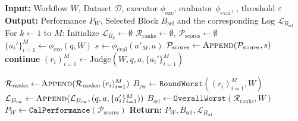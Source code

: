 \documentclass{article}
\theoremstyle{plain}
\theoremstyle{definition}
\theoremstyle{remark}
\begin{document}
\begin{algorithm}[t]
\caption{Evaluation-Judge}\label{alg:eval_judge}
\begin{algorithmic}[1]
    \STATE \textbf{Input:} Workflow $W$, Dataset $\mathcal{D}$, executor $\phi_{\text{exe}}$, evaluator $\phi_{\text{eval}}$, , threshold $\varepsilon$
    \STATE \textbf{Output:} Performance $P_W$, Selected Block $B_{\text{sel}}$ and the corresponding Log $\mathcal{L}_{B_{\text{sel}}}$
    \STATE For $k \leftarrow 1 \text{ to } M$: Initialize $\mathcal{L}_{B_k} \leftarrow \emptyset$ 
    \STATE $\mathcal{R}_{\text{ranks}} \leftarrow \emptyset$, $\mathcal{P}_{\text{scores}} \leftarrow \emptyset$
        \STATE $\{a_i'\}_{i=1}^M \leftarrow \phi_{\text{exe}}(q, W)$
        \STATE  $s\leftarrow \phi_{\text{eval}}(a'_M, a)$ 
        \STATE $\mathcal{P}_{\text{scores}} \gets \textsc{Append}(\mathcal{P}_{\text{scores}}, s)$
            \STATE \textbf{continue} %
        \ELSE
            \STATE $(r_i)_{i=1}^M \leftarrow \text{Judge}(W, q, a, \{a_i'\}_{i=1}^M)$ %
            
            \STATE $\mathcal{R}_{\text{ranks}} \gets \textsc{Append}(\mathcal{R}_{\text{ranks}}, (r_i)_{i=1}^M)$ %
            \STATE $B_{\text{rw}} \leftarrow \texttt{RoundWorst}((r_i)_{i=1}^M, W)$ %
            \STATE $\mathcal{L}_{B_{\text{rw}}} \gets \textsc{Append}(\mathcal{L}_{B_{\text{rw}}}, (q, a, \{a_i'\}_{i=1}^M))$ %
        \ENDIF
    \ENDFOR
    \STATE $B_{\text{sel}} \leftarrow \texttt{OverallWorst}(\mathcal{R}_{\text{ranks}}, W)$ %
    \STATE $P_W \leftarrow \texttt{CalPerformance}(\mathcal{P}_{\text{scores}})$ %
    \STATE \textbf{Return:} $P_W, B_{\text{sel}}, \mathcal{L}_{B_{\text{sel}}}$
\end{algorithmic}
\end{algorithm}
\end{document}
